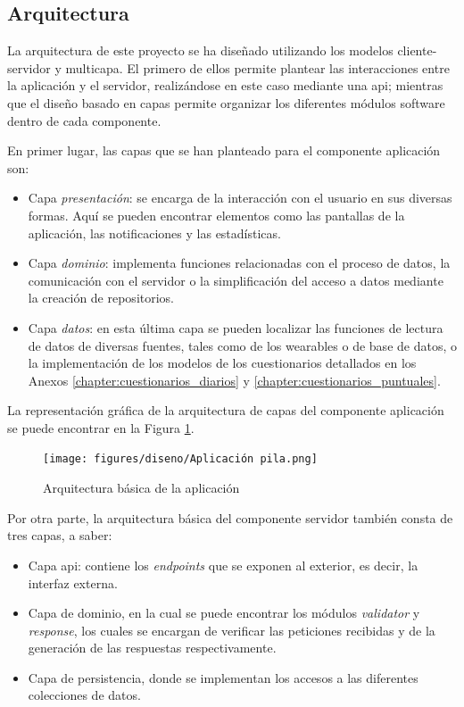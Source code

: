         \subsection{Arquitectura}

            La arquitectura de este proyecto se ha diseñado utilizando los modelos cliente-servidor y multicapa. El primero de ellos permite plantear las interacciones entre la aplicación y el servidor, realizándose en este caso mediante una \gls{api}; mientras que el diseño basado en capas permite organizar los diferentes módulos software dentro de cada componente. 

            En primer lugar, las capas que se han planteado para el componente aplicación son:

            \begin{itemize}
                \item Capa \textit{presentación}: se encarga de la interacción con el usuario en sus diversas formas. Aquí se pueden encontrar elementos como las pantallas de la aplicación, las notificaciones y las estadísticas. 
                \item Capa \textit{dominio}: implementa funciones relacionadas con el proceso de datos, la comunicación con el servidor o la simplificación del acceso a datos mediante la creación de repositorios.
                \item Capa \textit{datos}: en esta última capa se pueden localizar las funciones de lectura de datos de diversas fuentes, tales como de los \glspl{wearable} o de base de datos, o la implementación de los modelos de los cuestionarios detallados en los Anexos \ref{chapter:cuestionarios_diarios} y \ref{chapter:cuestionarios_puntuales}. 
            \end{itemize}

            La representación gráfica de la arquitectura de capas del componente aplicación se puede encontrar en la Figura \ref{figure:disenio:arquitectura_app}.
        
            \begin{figure}[h]
                \centering
                \texttt{[image: figures/diseno/Aplicación pila.png]}
                \caption{Arquitectura básica de la aplicación}
                \label{figure:disenio:arquitectura_app}
            \end{figure}
            
            Por otra parte, la arquitectura básica del componente servidor también consta de tres capas, a saber: 
            \begin{itemize}
                \item Capa \gls{api}: contiene los \textit{endpoints} que se exponen al exterior, es decir, la interfaz externa.
                \item Capa de dominio, en la cual se puede encontrar los módulos \textit{validator} y \textit{response}, los cuales se encargan de verificar las peticiones recibidas y de la generación de las respuestas respectivamente.
                \item Capa de persistencia, donde se implementan los accesos a las diferentes colecciones de datos.
            \end{itemize}

